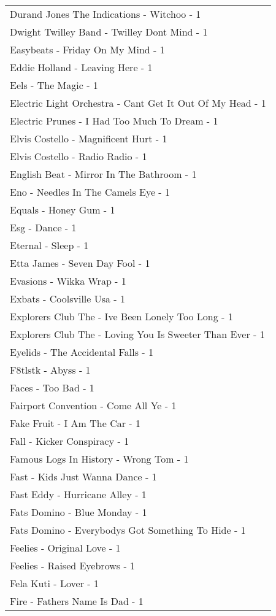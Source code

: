 \documentclass[
]{article}
\begin{document}
\begin{longtable}{l}
Durand Jones The Indications - Witchoo - 1 \\ 
Dwight Twilley Band - Twilley Dont Mind - 1 \\ 
Easybeats - Friday On My Mind - 1 \\ 
Eddie Holland - Leaving Here - 1 \\ 
Eels - The Magic - 1 \\ 
Electric Light Orchestra - Cant Get It Out Of My Head - 1 \\ 
Electric Prunes - I Had Too Much To Dream - 1 \\ 
Elvis Costello - Magnificent Hurt - 1 \\ 
Elvis Costello - Radio Radio - 1 \\ 
English Beat - Mirror In The Bathroom - 1 \\ 
Eno - Needles In The Camels Eye - 1 \\ 
Equals - Honey Gum - 1 \\ 
Esg - Dance - 1 \\ 
Eternal - Sleep - 1 \\ 
Etta James - Seven Day Fool - 1 \\ 
Evasions - Wikka Wrap - 1 \\ 
Exbats - Coolsville Usa - 1 \\ 
Explorers Club The - Ive Been Lonely Too Long - 1 \\ 
Explorers Club The - Loving You Is Sweeter Than Ever - 1 \\ 
Eyelids - The Accidental Falls - 1 \\ 
F8tlstk - Abyss - 1 \\ 
Faces - Too Bad - 1 \\ 
Fairport Convention - Come All Ye - 1 \\ 
Fake Fruit - I Am The Car - 1 \\ 
Fall - Kicker Conspiracy - 1 \\ 
Famous Logs In History - Wrong Tom - 1 \\ 
Fast - Kids Just Wanna Dance - 1 \\ 
Fast Eddy - Hurricane Alley - 1 \\ 
Fats Domino - Blue Monday - 1 \\ 
Fats Domino - Everybodys Got Something To Hide - 1 \\ 
Feelies - Original Love - 1 \\ 
Feelies - Raised Eyebrows - 1 \\ 
Fela Kuti - Lover - 1 \\ 
Fire - Fathers Name Is Dad - 1 \\ 

\end{longtable}
\end{document}
